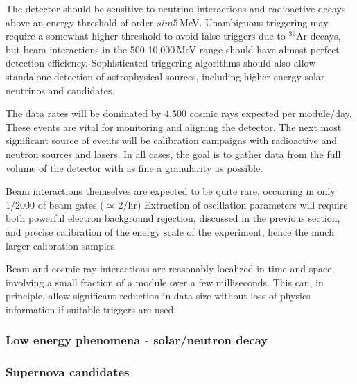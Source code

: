 \documentclass[../main-v1.tex]{subfiles}
\begin{document}
The detector should be sensitive to neutrino interactions and radioactive decays above an energy threshold of order $sim 5$\,MeV.  Unambiguous triggering may require a somewhat higher threshold  to avoid false triggers due to $^{39}$Ar decays,  but beam interactions in the 500-10,000\,MeV range should have almost perfect detection efficiency. Sophisticated triggering algorithms should also allow standalone detection of astrophysical sources, including higher-energy solar neutrinos and  candidates. 

The data rates will be dominated by 4,500 cosmic rays expected per module/day.  These events are vital for monitoring and aligning the detector. %
The next most significant source of events will be calibration campaigns with radioactive and neutron sources and lasers.  In all cases, the goal is to gather data from the full volume of the detector with as fine a granularity as possible. 

Beam interactions themselves are expected to be quite rare, occurring in only 1/2000 of beam gates ($\simeq$\,2/hr)  Extraction of oscillation parameters will require both powerful electron background rejection, discussed in the previous section,  and precise calibration of the energy scale of the experiment, hence the much larger calibration samples.

Beam and cosmic ray interactions are reasonably localized in time and space, involving a small fraction of a module over a few milliseconds.  This can, in principle, allow significant reduction in data size without loss of physics information if suitable triggers are used.

\subsubsection{Low energy phenomena - solar/neutron decay } 

\subsubsection{Supernova candidates }\label{sec:supernova}
\end{document}
